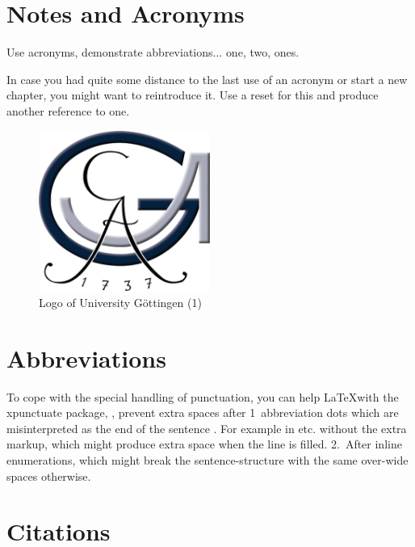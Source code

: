 
\section{Notes and Acronyms}
\label{sec:notes-acronyms}


Use acronyms, demonstrate abbreviations... \Gls{one}, \gls{two}, \glspl{one}.

In case you had quite some distance to the last use of an acronym or start a new chapter, you might want to reintroduce it. Use a reset for this and produce another reference to \gls{one}.

\begin{figure}[!ht]
  \centering
  \includegraphics[width=0.5\textwidth]{figures/UniLogo1.png}
  \caption{Logo of University Göttingen (1)}
  \label{fig:logo-1}
\end{figure}


\section{Abbreviations}
\label{sec:abbreviations}

To cope with the special handling of punctuation, you can help \LaTeX with the xpunctuate package, \ie, prevent extra spaces after 1\xperiod{}~abbreviation dots which are misinterpreted as the end of the sentence \etc. For example in etc. without the extra markup, which might produce extra space when the line is filled. 2.~After inline enumerations, which might break the sentence-structure with the same over-wide spaces otherwise.


\section{Citations}
\label{sec:citations}

